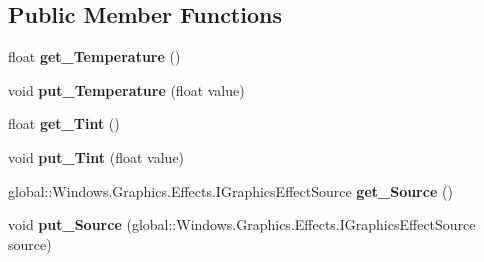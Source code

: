 \subsection*{Public Member Functions}
\begin{DoxyCompactItemize}
\item 
\mbox{\label{interface_microsoft_1_1_graphics_1_1_canvas_1_1_effects_1_1_i_temperature_and_tint_effect_a0dcedf68f7e7321d6b25cf8acc3ffebe}} 
float {\bfseries get\+\_\+\+Temperature} ()
\item 
\mbox{\label{interface_microsoft_1_1_graphics_1_1_canvas_1_1_effects_1_1_i_temperature_and_tint_effect_a8a0e800f16be6854f65cba20a5c93a53}} 
void {\bfseries put\+\_\+\+Temperature} (float value)
\item 
\mbox{\label{interface_microsoft_1_1_graphics_1_1_canvas_1_1_effects_1_1_i_temperature_and_tint_effect_a83755c8c5fde22df18b4171715632c15}} 
float {\bfseries get\+\_\+\+Tint} ()
\item 
\mbox{\label{interface_microsoft_1_1_graphics_1_1_canvas_1_1_effects_1_1_i_temperature_and_tint_effect_a6de0c0063e0a4554bb5a7c590e37966b}} 
void {\bfseries put\+\_\+\+Tint} (float value)
\item 
\mbox{\label{interface_microsoft_1_1_graphics_1_1_canvas_1_1_effects_1_1_i_temperature_and_tint_effect_a193a544f1bcaed2247fe83207e320a69}} 
global\+::\+Windows.\+Graphics.\+Effects.\+I\+Graphics\+Effect\+Source {\bfseries get\+\_\+\+Source} ()
\item 
\mbox{\label{interface_microsoft_1_1_graphics_1_1_canvas_1_1_effects_1_1_i_temperature_and_tint_effect_a8bb22acb219949af2af4ec2202ff8e1f}} 
void {\bfseries put\+\_\+\+Source} (global\+::\+Windows.\+Graphics.\+Effects.\+I\+Graphics\+Effect\+Source source)

\end{DoxyCompactItemize}
